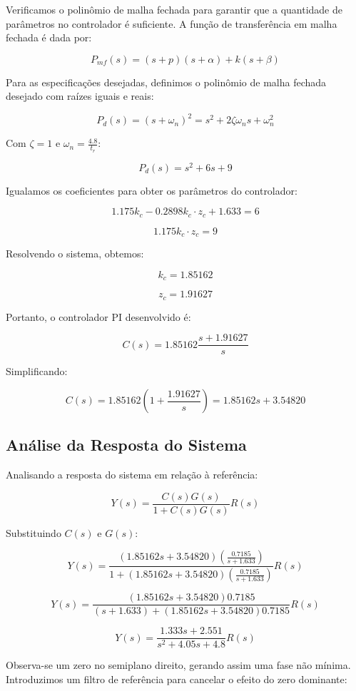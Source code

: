 \documentclass[a4paper,12pt]{report}
\begin{document}
Verificamos o polinômio de malha fechada para garantir que a quantidade de parâmetros no controlador é suficiente. A função de transferência em malha fechada é dada por:

\[
P_{mf}(s) = (s + p)(s + \alpha) + k (s + \beta)
\]

Para as especificações desejadas, definimos o polinômio de malha fechada desejado com raízes iguais e reais:

\[
P_d(s) = (s + \omega_n)^2 = s^2 + 2\zeta \omega_n s + \omega_n^2
\]

Com \( \zeta = 1 \) e \( \omega_n = \frac{4.8}{t_r} \):

\[
P_d(s) = s^2 + 6s + 9
\]

Igualamos os coeficientes para obter os parâmetros do controlador:

\[
1.175k_c - 0.2898k_c \cdot z_c + 1.633 = 6
\]

\[
1.175k_c \cdot z_c = 9
\]

Resolvendo o sistema, obtemos:

\[
k_c = 1.85162
\]

\[
z_c = 1.91627
\]

Portanto, o controlador PI desenvolvido é:

\[
C(s) = 1.85162 \frac{s + 1.91627}{s}
\]

Simplificando:

\[
C(s) = 1.85162 \left(1 + \frac{1.91627}{s}\right) = 1.85162s + 3.54820
\]

\subsection*{Análise da Resposta do Sistema}

Analisando a resposta do sistema em relação à referência:

\[
Y(s) = \frac{C(s)G(s)}{1 + C(s)G(s)}R(s)
\]

Substituindo \( C(s) \) e \( G(s) \):

\[
Y(s) = \frac{(1.85162s + 3.54820)\left(\frac{0.7185}{s + 1.633}\right)}{1 + (1.85162s + 3.54820)\left(\frac{0.7185}{s + 1.633}\right)}R(s)
\]

\[
Y(s) = \frac{(1.85162s + 3.54820)0.7185}{(s + 1.633) + (1.85162s + 3.54820)0.7185}R(s)
\]

\[
Y(s) = \frac{1.333s + 2.551}{s^2 + 4.05s + 4.8}R(s)
\]

Observa-se um zero no semiplano direito, gerando assim uma fase não mínima. Introduzimos um filtro de referência para cancelar o efeito do zero dominante:
\end{document}
